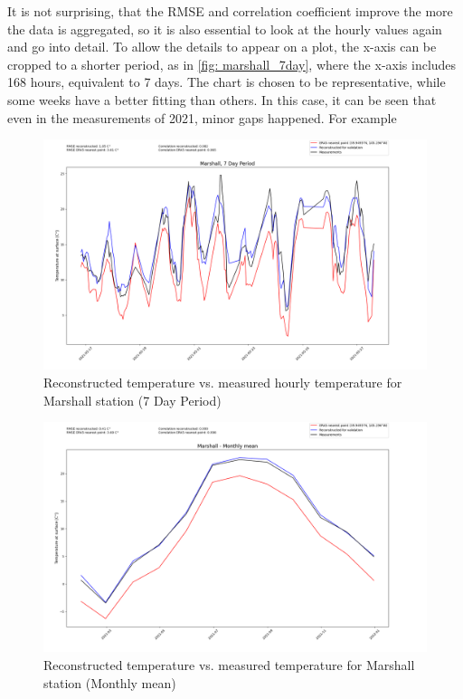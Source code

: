 It is not surprising, that the RMSE and correlation coefficient improve the more the data is aggregated, so it is also essential to look at the hourly values again and go into detail. To allow the details to appear on a plot, the x-axis can be cropped to a shorter period, as in \autoref{fig: marshall_7day}, where the x-axis includes 168 hours, equivalent to 7 days.
The chart is chosen to be representative, while some weeks have a better fitting than others. In this case, it can be seen that even in the measurements of 2021, minor gaps happened. For example  


\begin{figure}
    \centering
    \includegraphics[width=1.00\textwidth]{resources/images/charts/marshall_eval_grib_final/Marshall, 7 Day Period_1_2_3.png}
    \caption{Reconstructed temperature vs. measured hourly temperature for Marshall station (7 Day Period)}
    \label{fig: marshall_7day}
\end{figure}

\begin{figure}
    \centering
    \includegraphics[width=1.00\textwidth]{resources/images/charts/marshall_eval_grib_final/Marshall - Monthly mean.png}
    \caption{Reconstructed temperature vs. measured temperature for Marshall station (Monthly mean)}
\end{figure}

